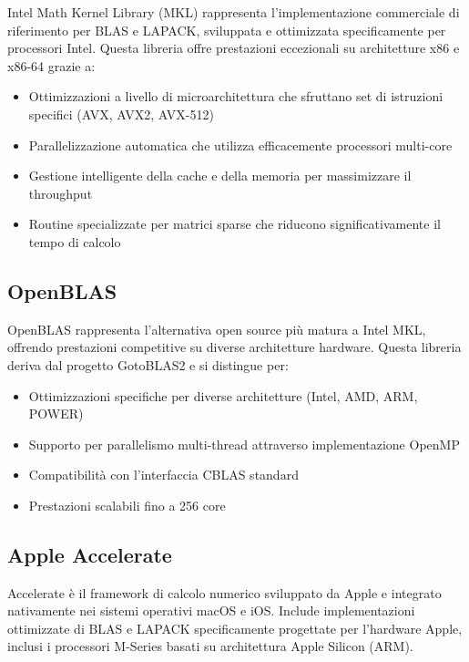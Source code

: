 Intel Math Kernel Library (MKL) rappresenta l'implementazione commerciale di riferimento per BLAS e LAPACK, sviluppata e ottimizzata 
specificamente per processori Intel. Questa libreria offre prestazioni eccezionali su architetture x86 e x86-64 grazie a:

\begin{itemize}
    \item Ottimizzazioni a livello di microarchitettura che sfruttano set di istruzioni specifici (AVX, AVX2, AVX-512)
    \item Parallelizzazione automatica che utilizza efficacemente processori multi-core
    \item Gestione intelligente della cache e della memoria per massimizzare il throughput
    \item Routine specializzate per matrici sparse che riducono significativamente il tempo di calcolo
\end{itemize}

\subsection{OpenBLAS}

OpenBLAS rappresenta l'alternativa open source più matura a Intel MKL, offrendo prestazioni competitive su diverse architetture hardware. 
Questa libreria deriva dal progetto GotoBLAS2 e si distingue per:

\begin{itemize}
    \item Ottimizzazioni specifiche per diverse architetture (Intel, AMD, ARM, POWER)
    \item Supporto per parallelismo multi-thread attraverso implementazione OpenMP
    \item Compatibilità con l'interfaccia CBLAS standard
    \item Prestazioni scalabili fino a 256 core
\end{itemize}

\subsection{Apple Accelerate}

Accelerate è il framework di calcolo numerico sviluppato da Apple e integrato nativamente nei sistemi operativi macOS e iOS.
Include implementazioni ottimizzate di BLAS e LAPACK specificamente progettate per l'hardware Apple, inclusi i processori M-Series basati su architettura Apple Silicon (ARM).

